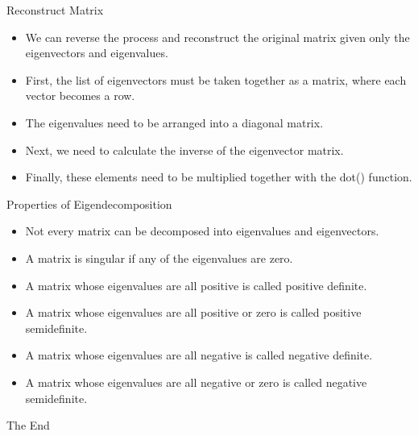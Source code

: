\documentclass{beamer}
\begin{document}
\begin{frame}{Reconstruct Matrix}
\begin{itemize}
    \item We can reverse the process and reconstruct the original matrix given only the eigenvectors and eigenvalues.
    \item First, the list of eigenvectors must be taken together as a matrix, where each vector becomes a row.
    \item The eigenvalues need to be arranged into a diagonal matrix.
    \item Next, we need to calculate the inverse of the eigenvector matrix.
    \item Finally, these elements need to be multiplied together with the dot() function.
\end{itemize}
\end{frame}

\begin{frame}{Properties of Eigendecomposition}
\begin{itemize}
    \item Not every matrix can be decomposed into eigenvalues and eigenvectors.
    \item A matrix is singular if any of the eigenvalues are zero.
    \item A matrix whose eigenvalues are all positive is called positive definite.
	\item A matrix whose eigenvalues are all positive or zero is called positive semidefinite.
	\item A matrix whose eigenvalues are all negative is called negative definite.
	\item A matrix whose eigenvalues are all negative or zero is called negative semidefinite.
\end{itemize}
\end{frame}

\begin{frame}
\huge{\centerline{The End}}
\end{frame}
\end{document}
